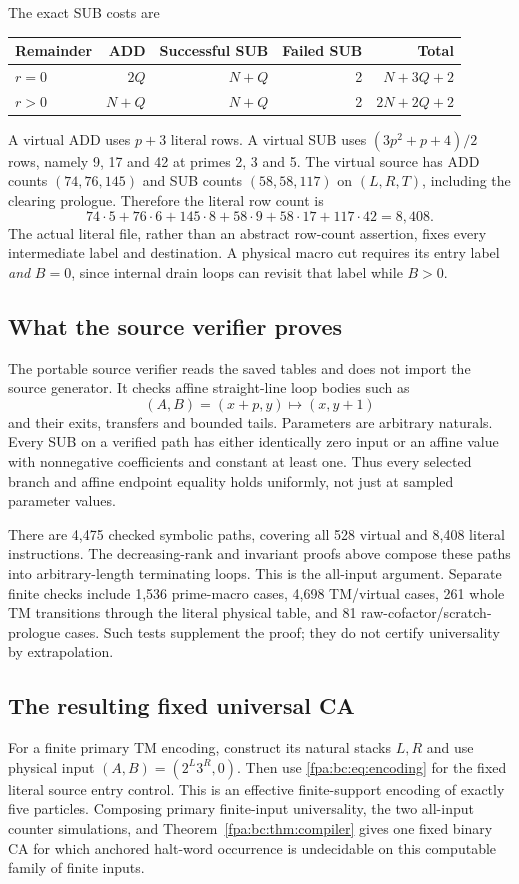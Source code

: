 \documentclass[11pt,a4paper]{article}
\numberwithin{equation}{section}
\begin{document}
The exact SUB costs are
\begin{center}
\begin{tabular}{lrrrr}
\toprule
Remainder&ADD&Successful SUB&Failed SUB&Total\\
\midrule
$r=0$&$2Q$&$N+Q$&2&$N+3Q+2$\\
$r>0$&$N+Q$&$N+Q$&2&$2N+2Q+2$\\
\bottomrule
\end{tabular}
\end{center}
A virtual ADD uses $p+3$ literal rows. A virtual SUB uses
$(3p^2+p+4)/2$ rows, namely 9, 17 and 42 at primes 2, 3 and 5. The virtual
source has ADD counts $(74,76,145)$ and SUB counts $(58,58,117)$ on
$(L,R,T)$, including the clearing prologue. Therefore the literal row count is
\[
 74\cdot5+76\cdot6+145\cdot8+
 58\cdot9+58\cdot17+117\cdot42=8,408.
\]
The actual literal file, rather than an abstract row-count assertion, fixes
every intermediate label and destination. A physical macro cut requires its
entry label \emph{and} $B=0$, since internal drain loops can revisit that
label while $B>0$.

\subsection{What the source verifier proves}
The portable source verifier reads the saved tables and does not import the
source generator. It checks affine straight-line loop bodies such as
\[
 (A,B)=(x+p,y)\longmapsto(x,y+1)
\]
and their exits, transfers and bounded tails. Parameters are arbitrary
naturals. Every SUB on a verified path has either identically zero input or
an affine value with nonnegative coefficients and constant at least one.
Thus every selected branch and affine endpoint equality holds uniformly,
not just at sampled parameter values.

There are 4,475 checked symbolic paths, covering all 528 virtual and 8,408
literal instructions. The decreasing-rank and invariant proofs above compose
these paths into arbitrary-length terminating loops. This is the all-input
argument. Separate finite checks include 1,536 prime-macro cases, 4,698
TM/virtual cases, 261 whole TM transitions through the literal physical table,
and 81 raw-cofactor/scratch-prologue cases. Such tests supplement the proof;
they do not certify universality by extrapolation.

\subsection{The resulting fixed universal CA}
For a finite primary TM encoding, construct its natural stacks $L,R$ and use
physical input $(A,B)=(2^L3^R,0)$. Then use \eqref{fpa:bc:eq:encoding} for the fixed
literal source entry control. This is an effective finite-support encoding of
exactly five particles. Composing primary finite-input universality, the two
all-input counter simulations, and Theorem~\ref{fpa:bc:thm:compiler} gives one fixed
binary CA for which anchored halt-word occurrence is undecidable on this
computable family of finite inputs.
\end{document}
